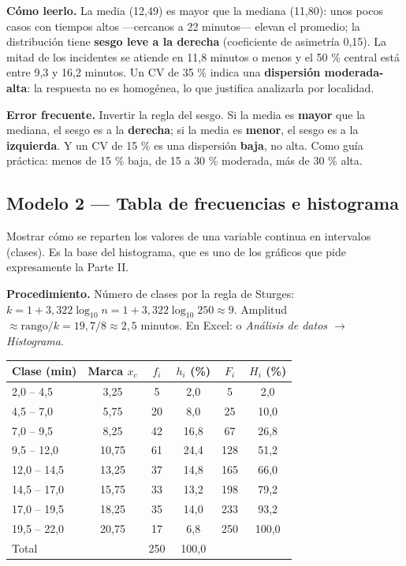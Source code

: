 \textbf{Cómo leerlo.} La media (12,49) es mayor que la mediana (11,80): unos pocos casos
con tiempos altos ---cercanos a 22 minutos--- elevan el promedio; la distribución tiene
\textbf{sesgo leve a la derecha} (coeficiente de asimetría 0,15). La mitad de los
incidentes se atiende en 11,8 minutos o menos y el 50 \% central está entre 9,3 y 16,2
minutos. Un CV de 35 \% indica una \textbf{dispersión moderada-alta}: la respuesta no es
homogénea, lo que justifica analizarla por localidad.

\begin{cajaAlerta}
\textbf{Error frecuente.} Invertir la regla del sesgo. Si la media es \textbf{mayor} que
la mediana, el sesgo es a la \textbf{derecha}; si la media es \textbf{menor}, el sesgo es
a la \textbf{izquierda}. Y un CV de 15 \% es una dispersión \textbf{baja}, no alta.
Como guía práctica: menos de 15 \% baja, de 15 a 30 \% moderada, más de 30 \% alta.
\end{cajaAlerta}

\subsection{Modelo 2 --- Tabla de frecuencias e histograma}

\begin{cajaModelo}
Mostrar cómo se reparten los valores de una variable continua en intervalos (clases).
Es la base del histograma, que es uno de los gráficos que pide expresamente la Parte II.
\end{cajaModelo}

\textbf{Procedimiento.} Número de clases por la regla de Sturges:
$k = 1 + 3{,}322\log_{10} n = 1 + 3{,}322\log_{10}250 \approx 9$. Amplitud
$\approx \text{rango}/k = 19{,}7/8 \approx 2{,}5$ minutos. En Excel:
 o \textit{Análisis de datos $\rightarrow$ Histograma}.

\begin{center}
\small
\begin{tabular}{@{}lccccc@{}}
\toprule
Clase (min) & Marca $x_c$ & $f_i$ & $h_i$ (\%) & $F_i$ & $H_i$ (\%)\\
\midrule
2,0 -- 4,5 & 3,25 & 5 & 2,0 & 5 & 2,0\\
4,5 -- 7,0 & 5,75 & 20 & 8,0 & 25 & 10,0\\
7,0 -- 9,5 & 8,25 & 42 & 16,8 & 67 & 26,8\\
9,5 -- 12,0 & 10,75 & 61 & 24,4 & 128 & 51,2\\
12,0 -- 14,5 & 13,25 & 37 & 14,8 & 165 & 66,0\\
14,5 -- 17,0 & 15,75 & 33 & 13,2 & 198 & 79,2\\
17,0 -- 19,5 & 18,25 & 35 & 14,0 & 233 & 93,2\\
19,5 -- 22,0 & 20,75 & 17 & 6,8 & 250 & 100,0\\
\midrule
Total & & 250 & 100,0 & & \\
\bottomrule
\end{tabular}
\end{center}

